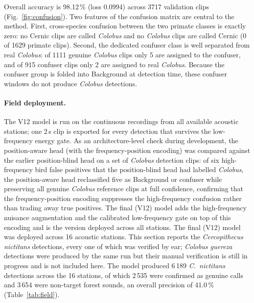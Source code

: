 \documentclass[final,3p,times]{elsarticle}
\begin{document}
\noindent Overall accuracy is 98.12\,\% (loss 0.0994) across 3717 validation
clips (Fig.~\ref{fig:confusion}). Two features of the confusion matrix are
central to the method. First,
cross-species confusion between the two primate classes is exactly zero: no
Cernic clips are called \textit{Colobus} and no \textit{Colobus} clips are
called Cernic (0 of 1629 primate clips). Second, the dedicated confuser class
is well separated from real \textit{Colobus}: of 1111 genuine \textit{Colobus}
clips only 5 are assigned to the confuser, and of 915 confuser clips only 2
are assigned to real \textit{Colobus}. Because the confuser group is folded
into Background at detection time, these confuser windows do not produce
\textit{Colobus} detections.

\paragraph{Field deployment.}
The V12 model is run on the continuous recordings from all available acoustic
stations; one 2\,s clip is exported for every detection that survives the
low-frequency energy gate. As an architecture-level check during development,
the position-aware head (with the frequency-position encoding) was compared
against the earlier position-blind head on a set of \textit{Colobus} detection
clips: of six high-frequency bird false positives that the position-blind head
had labelled \textit{Colobus}, the position-aware head reclassified
five as Background or confuser while preserving all genuine \textit{Colobus}
reference clips at full confidence, confirming that the frequency-position
encoding suppresses the high-frequency confusion rather than trading away true
positives. The final (V12) model adds the high-frequency nuisance augmentation
and the calibrated low-frequency gate on top of this encoding and is the
version deployed across all stations.
The final (V12) model was deployed across 16 acoustic stations. This section
reports the \textit{Cercopithecus nictitans} detections, every one of which was
verified by ear; \textit{Colobus guereza} detections were produced by the same
run but their manual verification is still in progress and is not included
here. The model produced 6\,189 \textit{C.\ nictitans} detections across the 16
stations, of which 2\,535 were confirmed as genuine calls and 3\,654 were
non-target forest sounds, an overall precision of 41.0\,\%
(Table~\ref{tab:field}).
\end{document}
